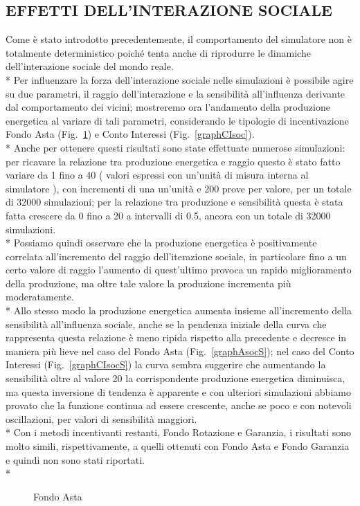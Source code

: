 \documentclass[12pt,a4paper,openright,twoside]{report}
\begin{document}
\subsection{EFFETTI DELL'INTERAZIONE SOCIALE}
Come è stato introdotto precedentemente, il comportamento del simulatore non è totalmente deterministico poiché tenta anche di riprodurre le dinamiche dell'interazione sociale del mondo reale.\\*
Per influenzare la forza dell'interazione sociale nelle simulazioni è possibile agire su due parametri, il raggio dell'interazione e la sensibilità all'influenza derivante dal comportamento dei vicini; mostreremo ora l'andamento della produzione energetica al variare di tali parametri, considerando le tipologie di incentivazione Fondo Asta (Fig.~\ref{graphAsoc}) e Conto Interessi (Fig.~\ref{graphCIsoc}).\\*
Anche per ottenere questi risultati sono state effettuate numerose simulazioni: per ricavare la relazione tra produzione energetica e raggio questo è stato fatto variare da 1 fino a 40 ( valori espressi con un'unità di misura interna al simulatore ), con incrementi di una un'unità e 200 prove per valore, per un totale di 32000 simulazioni; per la relazione tra produzione e sensibilità questa è stata fatta crescere da 0 fino a 20 a intervalli di 0.5, ancora con un totale di 32000 simulazioni.\\*
Possiamo quindi osservare che la produzione energetica è positivamente correlata all'incremento del raggio dell'iterazione sociale, in particolare fino a un certo valore di raggio l'aumento di quest'ultimo provoca un rapido miglioramento della produzione, ma oltre tale valore la produzione incrementa più moderatamente.\\*
Allo stesso modo la produzione energetica aumenta insieme all'incremento della sensibilità all'influenza sociale, anche se la pendenza iniziale della curva che rappresenta questa relazione è meno ripida rispetto alla precedente e decresce in maniera più lieve nel caso del Fondo Asta (Fig.~\ref{graphAsocS}); nel caso del Conto Interessi (Fig.~\ref{graphCIsocS}) la curva sembra suggerire che aumentando la sensibilità oltre al valore 20 la corrispondente produzione energetica diminuisca, ma questa inversione di tendenza è apparente e con ulteriori simulazioni abbiamo provato che la funzione continua ad essere crescente, anche se poco e con notevoli oscillazioni, per valori di sensibilità maggiori. \\*
Con i metodi incentivanti restanti, Fondo Rotazione e Garanzia, i risultati sono molto simili, rispettivamente, a quelli ottenuti con Fondo Asta e Fondo Garanzia e quindi non sono stati riportati.\\*
\begin{figure}[H]
	\centering
	\qquad
	\caption{Fondo Asta}
	\label{graphAsoc}
\end{figure}
\end{document}
